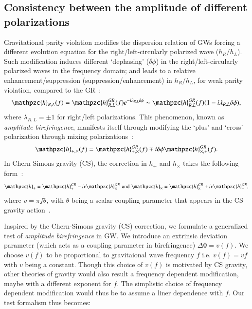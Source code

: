 \documentclass[prd,preprintnumbers,twocolumn,eqsecnum,floatfix,a4paper,nofootinbib,superscriptaddress]{revtex4}
\newcommand{\h}{\mathpzc{h}}
\newcommand{\btheta}{\bm{\theta}}
\begin{document}
\subsection{Consistency between the amplitude of different polarizations}
\label{sec4b}
Gravitational parity violation modifies the dispersion relation of GWs forcing a different evolution equation for the right/left-circularly polarized wave ($h_R/h_L$). Such modification induces different `dephasing' ($\delta \phi$) in the right/left-circularly polarized waves in the frequency domain; and leads to a relative enhancement/suppression (suppression/enhancement) in $h_R/h_L$, for weak parity violation, compared to the GR~\cite{yunes2010}:
\begin{eqnarray} 
\h_{R,L}(f) =  \h^{GR}_{R,L}(f) e^{-i \lambda_{R,L} \delta\phi} \sim \h^{GR}_{R,L}(f) (1-i \lambda_{R,L}\delta\phi),
\label{eq:cs_1}
\end{eqnarray}
where $\lambda_{R,L}=\pm1$ for right/left polarizations. This phenomenon, known as \textit{amplitude birefringence}, manifests itself through modifying  the `plus' and `cross' polarization through mixing polarizations~\cite{yunes2010}:
\begin{eqnarray} 
\h_{+,\times}(f) =  \h^{GR}_{+,\times}(f) \mp i \delta\phi \h^{GR}_{\times,+}(f).
\label{eq:cs_2}
\end{eqnarray}
In Chern-Simons gravity (CS), the correction in $h_{+}$ and $h_{\times}$ takes the following form~\cite{yunes2010}:
\begin{eqnarray} 
\h_{+} =  \h^{GR}_{+} -i v \h^{GR}_{\times}  \,\, \text{and} \,\,  \h_{\times} =  \h^{GR}_{\times} + i v \h^{GR}_{+},
\label{eq:cs_3}
\end{eqnarray}
where $v=\pi f \ddot{\theta}$, with $\theta$ being a scalar coupling parameter that appears in the CS gravity action~\cite{yunes2010}.  

Inspired by the Chern-Simons gravity (CS) correction, we formulate a generalized test of \textit{amplitude birefringence} in GW. We introduce an extrinsic deviation parameter (which acts as a coupling parameter in birefringence) $\Delta \btheta=v(f)$. We choose $v(f)$ to be proportional to gravitaional wave frequency $f$ i.e. $v(f)=vf$ with $v$ being a constant. Though this choice of $v(f)$ is motivated by CS gravity, other theories of gravity would also result a frequency dependent modification, maybe with a different exponent for $f$.  The simplistic choice of frequency dependent modification would thus be to assume a liner dependence with $f$.  Our test formalism thus becomes:
 
\end{document}
